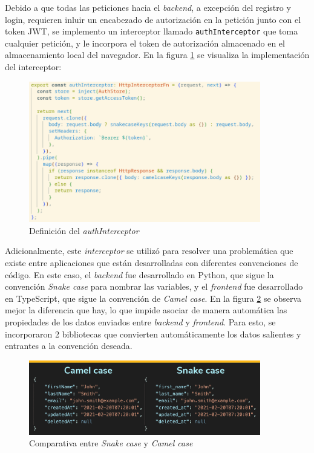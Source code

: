 Debido a que todas las peticiones hacia el \textit{backend}, a excepción del registro y login, requieren inluir un encabezado de autorización en la petición junto con el token JWT, se implemento un interceptor llamado \texttt{authInterceptor} que toma cualquier petición, y le incorpora el token de autorización almacenado en el almacenamiento local del navegador. En la figura \ref{frontend:interceptor} se visualiza la implementación del interceptor:

\begin{figure}[H]
	\centering
	\includegraphics[width=0.9\textwidth]{./Figures/frontend-interceptor.png}
	\caption{Definición del \textit{authInterceptor}}
	\label{frontend:interceptor}
\end{figure}

Adicionalmente, este \textit{interceptor} se utilizó para resolver una problemática que existe entre aplicaciones que están desarrolladas con diferentes convenciones de código. En este caso, el \textit{backend} fue desarrollado en Python, que sigue la convención \textit{Snake case} para nombrar las variables, y el \textit{frontend} fue desarrollado en TypeScript, que sigue la convención de \textit{Camel case}\citep{CODE:1}. En la figura \ref{frontend:snake-case} se observa mejor la diferencia que hay, lo que impide asociar de manera automática las propiedades de los datos enviados entre \textit{backend} y \textit{frontend}. Para esto, se incorporaron 2 bibliotecas que convierten automáticamente los datos salientes y entrantes a la convención deseada.

\begin{figure}[H]
	\centering
	\includegraphics[width=0.9\textwidth]{./Figures/snake-case.png}
	\caption{Comparativa entre \textit{Snake case} y \textit{Camel case}}
	\label{frontend:snake-case}
\end{figure}

